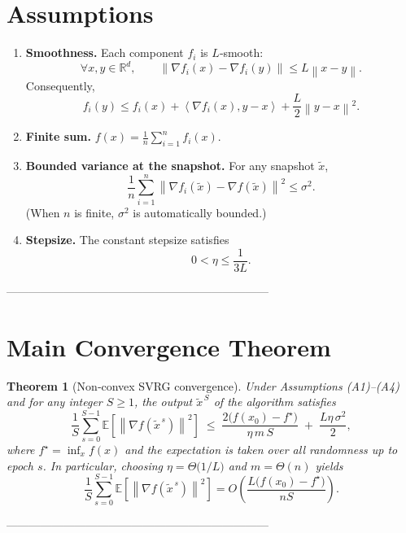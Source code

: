 \documentclass{article}
\newtheorem{theorem}{Theorem}
\newcommand{\E}{\mathbb{E}}
\newcommand{\R}{\mathbb{R}}
\newcommand{\norm}[1]{\left\|#1\right\|}
\newcommand{\inner}[2]{\left\langle #1,#2\right\rangle}
\begin{document}
\section*{Assumptions}
\begin{enumerate}
    \item[(A1)] \textbf{Smoothness.} Each component $f_i$ is $L$‑smooth:
    \[
    \forall x,y\in\R^{d},\qquad
    \norm{\nabla f_i(x)-\nabla f_i(y)}\le L\norm{x-y}.
    \]
    Consequently,
    \begin{equation}
    f_i(y)\le f_i(x)+\inner{\nabla f_i(x)}{y-x}+\frac{L}{2}\norm{y-x}^2.
    \label{eq:smooth}
    \end{equation}
    \item[(A2)] \textbf{Finite sum.} $f(x)=\frac1n\sum_{i=1}^{n}f_i(x)$.
    \item[(A3)] \textbf{Bounded variance at the snapshot.} For any snapshot $\tilde{x}$,
    \[
    \frac1n\sum_{i=1}^{n}\norm{\nabla f_i(\tilde{x})-\nabla f(\tilde{x})}^2\le\sigma^2 .
    \]
    (When $n$ is finite, $\sigma^2$ is automatically bounded.)
    \item[(A4)] \textbf{Stepsize.} The constant stepsize satisfies
    \[
    0<\eta\le\frac{1}{3L}.
    \]
\end{enumerate}

---------------------------------------------------------------------

\section*{Main Convergence Theorem}
\begin{theorem}[Non‑convex SVRG convergence]\label{thm:svrg}
Under Assumptions (A1)–(A4) and for any integer $S\ge1$, the output $\tilde{x}^{\,S}$ of the algorithm satisfies
\[
\boxed{
\frac{1}{S}\sum_{s=0}^{S-1}\E\!\left[\norm{\nabla f(\tilde{x}^{\,s})}^2\right]
\;\le\;
\frac{2\bigl(f(x_0)-f^\star\bigr)}{\eta\,m\,S}
\;+\;
\frac{L\eta\,\sigma^{2}}{2},
}
\]
where $f^\star=\inf_{x}f(x)$ and the expectation is taken over all randomness up to epoch $s$.
In particular, choosing $\eta =\Theta\!\bigl(1/L\bigr)$ and $m=\Theta(n)$ yields
\[
\frac{1}{S}\sum_{s=0}^{S-1}\E\!\left[\norm{\nabla f(\tilde{x}^{\,s})}^2\right]
=O\!\left(\frac{L\bigl(f(x_0)-f^\star\bigr)}{nS}\right).
\]
\end{theorem}

---------------------------------------------------------------------
\end{document}
